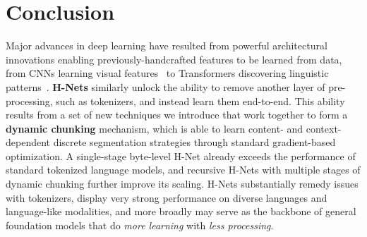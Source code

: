 \section{Conclusion}
\label{sec: conclusion}


Major advances in deep learning have resulted from powerful architectural innovations enabling previously-handcrafted features to be learned from data,
from CNNs learning visual features~\citep{AlexNet} to Transformers discovering linguistic patterns~\citep{Transformer}.
\textbf{H-Nets} similarly unlock the ability to remove another layer of pre-processing, such as tokenizers, and instead learn them end-to-end.
This ability results from a set of new techniques we introduce that work together to form a \textbf{dynamic chunking} mechanism,
which is able to learn content- and context- dependent discrete segmentation strategies through standard gradient-based optimization.
A single-stage byte-level H-Net already exceeds the performance of standard tokenized language models,
and recursive H-Nets with multiple stages of dynamic chunking further improve its scaling.
H-Nets substantially remedy issues with tokenizers, display very strong performance on diverse languages and language-like modalities,
and more broadly may serve as the backbone of general foundation models that do \emph{more learning} with \emph{less processing}.


